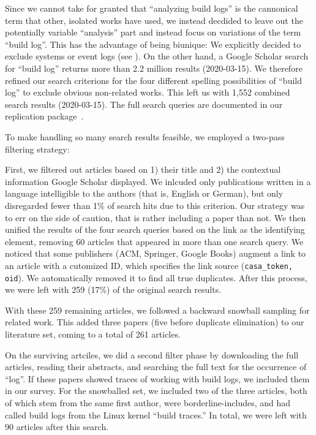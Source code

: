 Since we cannot take for granted that ``analyzing build logs'' is the
cannonical term that other, isolated works have used, we instead
decdided to leave out the potentially variable ``analysis'' part and
instead focus on variations of the term ``build log''.
This has the
advantage of being biunique: We explicitly decided to exclude systems
or event logs (see ).
On the other hand, a Google Scholar
search for ``build log'' returns more than 2.2 million results
(2020-03-15).
We therefore refined our search criterions for the four
different spelling possibilities of ``build log'' to exclude obvious
non-related works.
This left us with 1,552 combined search results
(2020-03-15).
The full search queries are documented in our replication
package~\cite{brandt2020chunk-replication}.

To make handling so many search results feasible, we employed a
two-pass filtering strategy:

First, we filtered out articles based on 1) their title and 2) the
contextual information Google Scholar displayed.
We inlcuded only
publications written in a language intelligible to the authors (that
is, English or German), but only disregarded fewer than 1\% of search
hits due to this criterion.
Our strategy was to err on the side of
caution, that is rather including a paper than not.
We then unified
the results of the four search queries based on the link as the
identifying element, removing 60 articles that appeared in more than
one search query.
We noticed that some publishers (ACM, Springer,
Google Books) augment a link to an article with a cutomized ID, which
specifies the link source ({\tt casa\_token, oid}).
 We automatically
removed it to find all true duplicates.
After this process, we were
left with 259 (17\%) of the original search results.

With these 259 remaining articles, we followed a backward snowball
sampling for related work.
This added three papers (five before
duplicate elimination) to our literature set, coming to a total of 261
articles.

On the surviving artciles, we did a second filter phase by downloading the
full articles, reading their abstracts, and searching the full text
for the occurrence of ``log''.
If these papers showed traces of
working with build logs, we included them in our survey.
For the
snowballed set, we included two of the three articles, both of which
stem from the same first author, were borderline-includes, and had
called build logs from the Linux kernel ``build traces.'' In total, we
were left with 90 articles after this search.


